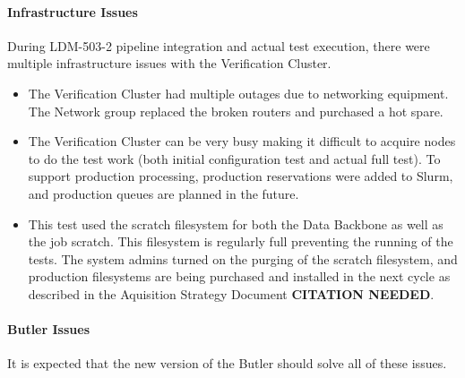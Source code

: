 \documentclass[DM,lsstdraft,STR,toc]{lsstdoc}
\begin{document}
\paragraph{Infrastructure Issues}

During LDM-503-2 pipeline integration and actual test execution, there were multiple infrastructure issues with the Verification Cluster.

\begin{itemize}

  \item{
    The Verification Cluster had multiple outages due to networking equipment.
    The Network group replaced the broken routers and purchased a hot spare.
  }

  \item{
    The Verification Cluster can be very busy making it difficult to acquire nodes to do the test work (both initial configuration test and actual full test).
    To support production processing, production reservations were added to Slurm, and production
queues are planned in the future.
  }


  \item{
    This test used the scratch filesystem for both the Data Backbone as well as the job scratch.
    This filesystem is regularly full preventing the running of the tests.
    The system admins turned on the purging of the scratch filesystem, and production filesystems are being purchased and installed in the next cycle as described in the Aquisition Strategy Document \textbf{CITATION NEEDED}.
  }

\end{itemize}

\paragraph{Butler Issues}

It is expected that the new version of the Butler should solve all of these issues.
\end{document}
